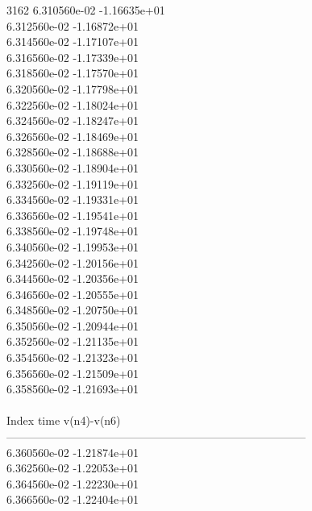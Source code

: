 3162	6.310560e-02	-1.16635e+01	\\ 	6.312560e-02	-1.16872e+01	\\ 	6.314560e-02	-1.17107e+01	\\ 	6.316560e-02	-1.17339e+01	\\ 	6.318560e-02	-1.17570e+01	\\ 	6.320560e-02	-1.17798e+01	\\ 	6.322560e-02	-1.18024e+01	\\ 	6.324560e-02	-1.18247e+01	\\ 	6.326560e-02	-1.18469e+01	\\ 	6.328560e-02	-1.18688e+01	\\ 	6.330560e-02	-1.18904e+01	\\ 	6.332560e-02	-1.19119e+01	\\ 	6.334560e-02	-1.19331e+01	\\ 	6.336560e-02	-1.19541e+01	\\ 	6.338560e-02	-1.19748e+01	\\ 	6.340560e-02	-1.19953e+01	\\ 	6.342560e-02	-1.20156e+01	\\ 	6.344560e-02	-1.20356e+01	\\ 	6.346560e-02	-1.20555e+01	\\ 	6.348560e-02	-1.20750e+01	\\ 	6.350560e-02	-1.20944e+01	\\ 	6.352560e-02	-1.21135e+01	\\ 	6.354560e-02	-1.21323e+01	\\ 	6.356560e-02	-1.21509e+01	\\ 	6.358560e-02	-1.21693e+01	\\ \hline
\\ \hline
Index   time            v(n4)-v(n6)     \\ \hline
--------------------------------------------------------------------------------\\ 	6.360560e-02	-1.21874e+01	\\ 	6.362560e-02	-1.22053e+01	\\ 	6.364560e-02	-1.22230e+01	\\ 	6.366560e-02	-1.22404e+01	\\ \hline

